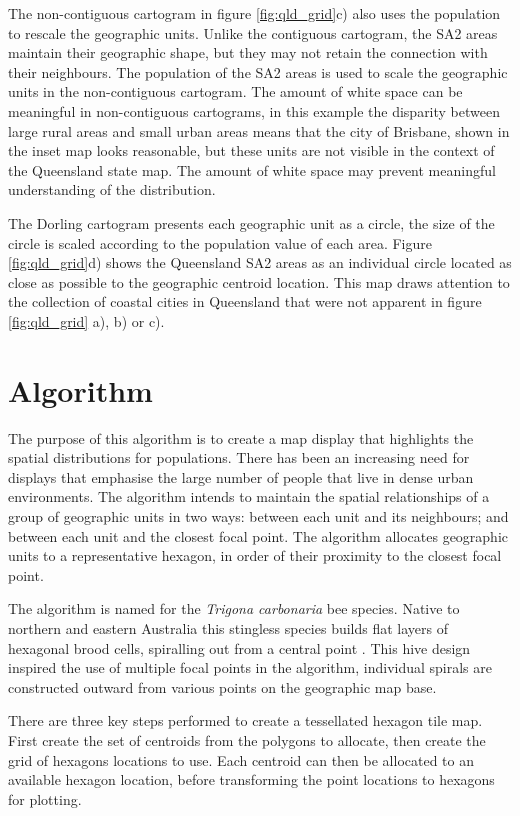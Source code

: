 \documentclass{monashthesis}
\begin{document}
The non-contiguous cartogram in figure \ref{fig:qld_grid}c) also uses the population to rescale the geographic units. Unlike the contiguous cartogram, the SA2 areas maintain their geographic shape, but they may not retain the connection with their neighbours. The population of the SA2 areas is used to scale the geographic units in the non-contiguous cartogram. The amount of white space can be meaningful in non-contiguous cartograms, in this example the disparity between large rural areas and small urban areas means that the city of Brisbane, shown in the inset map looks reasonable, but these units are not visible in the context of the Queensland state map. The amount of white space may prevent meaningful understanding of the distribution.

The Dorling cartogram presents each geographic unit as a circle, the size of the circle is scaled according to the population value of each area. Figure \ref{fig:qld_grid}d) shows the Queensland SA2 areas as an individual circle located as close as possible to the geographic centroid location. This map draws attention to the collection of coastal cities in Queensland that were not apparent in figure \ref{fig:qld_grid} a), b) or c).

\hypertarget{algorithm-1}{%
\section{Algorithm}\label{algorithm-1}}

The purpose of this algorithm is to create a map display that highlights the spatial distributions for populations. There has been an increasing need for displays that emphasise the large number of people that live in dense urban environments. The algorithm intends to maintain the spatial relationships of a group of geographic units in two ways: between each unit and its neighbours; and between each unit and the closest focal point. The algorithm allocates geographic units to a representative hexagon, in order of their proximity to the closest focal point.

The algorithm is named for the \emph{Trigona carbonaria} bee species. Native to northern and eastern Australia this stingless species builds flat layers of hexagonal brood cells, spiralling out from a central point \autocite{PH}. This hive design inspired the use of multiple focal points in the algorithm, individual spirals are constructed outward from various points on the geographic map base.

There are three key steps performed to create a tessellated hexagon tile map. First create the set of centroids from the polygons to allocate, then create the grid of hexagons locations to use. Each centroid can then be allocated to an available hexagon location, before transforming the point locations to hexagons for plotting.
\end{document}
